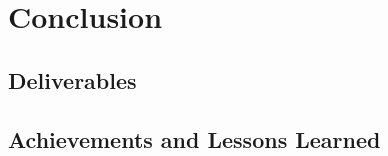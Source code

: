 \documentclass[17pt, aspectratio=169]{beamer}
\begin{document}
\section{Conclusion}
\subsection{Deliverables}
\subsection{Achievements and Lessons Learned}
\end{document}
